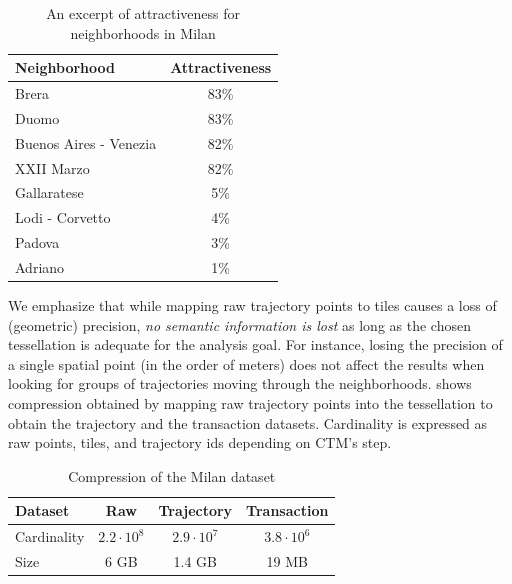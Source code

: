 \documentclass[
]{ceurart}
\renewcommand{\sf}[1]{\textsf{\textup{#1}}}
\begin{document}
\begin{table}[t]
    \centering
    \footnotesize
    \caption{An excerpt of attractiveness for neighborhoods in \sf{Milan}}
    \label{tbl:att}
    \begin{tabular}{lc}
    \toprule
        Neighborhood & Attractiveness \\
        \midrule
        Brera & 83\% \\ 
        Duomo & 83\% \\ 
        Buenos Aires - Venezia & 82\% \\ 
        XXII Marzo & 82\% \\
        Gallaratese & 5\% \\ 
        Lodi - Corvetto & 4\% \\ 
        Padova & 3\% \\
        Adriano & 1\% \\ \bottomrule
    \end{tabular}
\end{table}

We emphasize that while mapping raw trajectory points to tiles causes a loss of (geometric) precision, \textit{no semantic information is lost} as long as the chosen tessellation is adequate for the analysis goal.
For instance, losing the precision of a single spatial point (in the order of meters) does not affect the results when looking for groups of trajectories moving through the neighborhoods.
 shows compression obtained by mapping raw trajectory points into the tessellation to obtain the trajectory and the transaction datasets.
Cardinality is expressed as raw points, tiles, and trajectory ids depending on CTM's step.

\begin{table}[t]
\centering
\footnotesize
\caption{Compression of the \sf{Milan} dataset}
\label{tab:comp}
\begin{tabular}{lccc}
\toprule
Dataset     & Raw              & Trajectory       & Transaction\\
\midrule
Cardinality & $2.2 \cdot 10^8$ & $2.9 \cdot 10^7$ & $3.8 \cdot 10^6$\\
Size        & 6 GB              & 1.4 GB            & 19 MB            \\
\bottomrule
\end{tabular}
\end{table}
\end{document}
